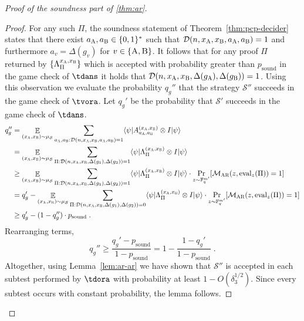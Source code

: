 \documentclass[11pt]{article}
\theoremstyle{definition}
\newcommand{\ket}[1]{|#1\rangle}
\newcommand{\bra}[1]{\langle#1|}
\DeclareMathOperator*{\Expectation}{\mathbb{E}}
\newcommand{\Es}[1]{\Expectation_{#1}}
\newcommand{\F}{\ensuremath{\mathbb{F}}}
\newcommand{\ot}{\otimes}
\newcommand{\sampler}{\mathcal{S}}
\newcommand{\decider}{\mathcal{D}}
\newcommand{\strategy}{\mathscr{S}}
\newcommand{\gamestyle}[1]{\ensuremath{\textsc{#1}}\xspace}
\newcommand{\ar}{\gamestyle{AR}}
\newcommand{\labelstyle}[1]{\ensuremath{\textsc{#1}}\xspace}
\newcommand{\alice}{\labelstyle{A}}
\newcommand{\bob}{\labelstyle{B}}
\newcommand{\eval}{\mathrm{eval}}
\newcommand{\pcpverifier}{\mathcal{M}_\ar}
\newcommand{\soundness}{\mathrm{sound}}
\begin{document}
\begin{proof}[Proof of the soundness part of \cref{thm:ar}]
\begin{proof}
  For any such $\Pi$, the soundness statement of Theorem~\ref{thm:pcp-decider}
  states that there exist $a_\alice, a_\bob \in \{0,1\}^*$ such that
  $\decider(n, {x}_\alice, {x}_\bob, a_\alice, a_\bob) = 1$ and furthermore
  $a_v = \Delta(g_v)$ for $v \in \{\alice,\bob\}$.   
It follows that for any proof $\Pi$ returned by
  $\{\Lambda^{{x}_\alice,{x}_\bob}_\Pi\}$ which is accepted with probability
  greater than $p_{\soundness}$ in the game check of $\tdans$ it holds
  that $\decider(n, {x}_\alice, {x}_\bob, \Delta(g_\alice), \Delta(g_\bob)) =
  1$.
  Using this observation we evaluate the probability $q_g''$ that the strategy
  $\strategy''$ succeeds in the game check of $\tvora$.
  Let $q_g'$ be the probability that $\strategy'$ succeeds in the game check of
  $\tdans$.
  \begin{align*}
    q_g'' &= \Es{({x}_\alice,{x}_\bob) \sim \mu_{\sampler}} \sum_{a_\alice,
            a_\bob: \decider(n,{x}_\alice,{x}_\bob, a_\alice, a_\bob) = 1}
            \bra{\psi} A^{({x}_\alice,{x}_\bob)}_{a_\alice, a_\bob} \ot I
            \ket{\psi}    \\
          &= \Es{({x}_\alice,{x}_\bob) \sim \mu_{\sampler}} \sum_{\Pi
            : \decider(n,{x}_\alice,{x}_\bob, \Delta(g_1), \Delta(g_2)) = 1}
            \bra{\psi} \Lambda^{({x}_\alice,{x}_\bob)}_{\Pi} \ot I
            \ket{\psi} \\
          &\geq \Es{({x}_\alice,{x}_\bob) \sim \mu_{\sampler}} \sum_{\Pi
            : \decider(n,{x}_\alice,{x}_\bob, \Delta(g_1), \Delta(g_2)) = 1}
            \bra{\psi} \Lambda^{({x}_\alice,{x}_\bob)}_{\Pi} \ot I
            \ket{\psi} \cdot \Pr_{z \sim \F_q^{m'}} [
            \pcpverifier(z,\eval_z(\Pi)) = 1]\\
          &= q_g' -  \Es{({x}_\alice,{x}_\bob) \sim \mu_{\sampler}} \sum_{\Pi
            : \decider(n,{x}_\alice,{x}_\bob, \Delta(g_1), \Delta(g_2)) = 0}
            \bra{\psi} \Lambda^{({x}_\alice,{x}_\bob)}_{\Pi} \ot I
            \ket{\psi} \cdot \Pr_{z \sim \F_q^{m'}} [
            \pcpverifier(z,\eval_z(\Pi))= 1] \\
          &\geq q_g' - ( 1- q_g'')\cdot
            p_{\soundness} \;.
  \end{align*}
  Rearranging terms,
  \begin{equation}
    q_g'' \geq \frac{q_g' - p_{\soundness}}{1 - p_{\soundness}} 
    = 1 - \frac{1-q_g'}{1 - p_{\soundness}}\;. \label{eq:pgameora}
  \end{equation}
  Altogether, using Lemma~\ref{lem:ar-ar} we have shown that $\strategy''$ is
  accepted in each subtest performed by $\tdora$ with probability at
  least $1 - O(\delta_3^{1/2})$.
  Since every subtest occurs with constant probability, the lemma follows.
  \end{proof}
	

\end{proof}
\end{document}
